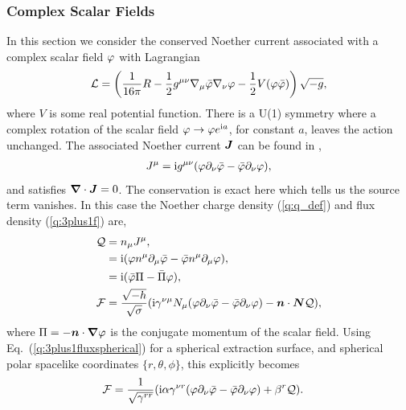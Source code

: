 \subsubsection{Complex Scalar Fields} \label{q:sect:noether1}
In this section we consider the conserved Noether current associated with a complex scalar field $\varphi$ with Lagrangian
\begin{equation}
\label{q:csfl}\mathcal{L} = \left(\frac{1}{16 \pi }R -\frac{1}{2}g^{\mu\nu}\nabla_\mu \bar{\varphi} \nabla_\nu \varphi - \frac{1}{2}V(\varphi \bar{\varphi}) \right)\sqrt{-g},
\end{equation}
where $V$ is some real potential function. There is a U(1) symmetry where a complex rotation of the scalar field $\varphi \rightarrow \varphi e^{{\rm i} a}$, for constant $a$, leaves the action unchanged. The associated Noether current $\boldsymbol{J}$ can be found in \cite{liebling2017dynamical},
\begin{align}
J^\mu = {\rm i} g^{\mu\nu}(\varphi\partial_\nu \bar{\varphi} - \bar{\varphi}\partial_\nu \varphi),
\end{align}
and satisfies $\boldsymbol{\nabla}\cdot\boldsymbol{J} = 0$. The conservation is exact here which tells us the source term vanishes. In this case the Noether charge density (\ref{q:q_def}) and flux density (\ref{q:3plus1f}) are,
\begin{align}
\mathcal{Q}&= n_\mu J^\mu, \\
           &= {\rm i} (\varphi n^\mu\partial_\mu \bar{\varphi} - \bar{\varphi} n^\mu\partial_\mu \varphi), \\
           & = {\rm i}(\bar{\varphi} \Pi - \bar\Pi \varphi), \\
\mathcal{F} &= \frac{\sqrt{-h}}{\sqrt{\sigma}}({\rm i}\gamma^{\nu \mu}N_\mu (\varphi \partial_\nu \bar{\varphi} - \bar{\varphi} \partial_\nu \varphi) - \boldsymbol{n} \cdot \boldsymbol{N}  \mathcal{Q}),
\end{align}
where $\Pi = -\boldsymbol{n} \cdot\boldsymbol{\nabla}\varphi$ is the conjugate momentum of the scalar field. Using Eq.~(\ref{q:3plus1fluxspherical}) for a spherical extraction surface, and spherical polar spacelike coordinates $\{r,\theta,\phi\}$, this explicitly becomes
\begin{align}
\mathcal{F} &= \frac{1}{\sqrt{\gamma^{rr}}}({\rm i}\alpha\gamma^{\nu r} (\varphi \partial_\nu \bar{\varphi} - \bar{\varphi} \partial_\nu \varphi) + {\beta^r} \mathcal{Q}).
       \end{align}




